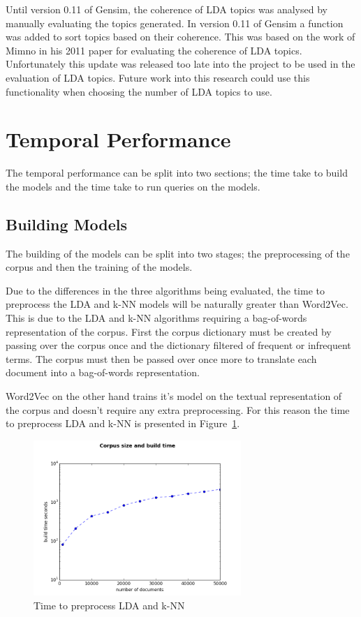 Until version 0.11 of Gensim, the coherence of LDA topics was analysed by manually evaluating the topics generated.
In version 0.11 of Gensim a function was added to sort topics based on their coherence.
This was based on the work of Mimno in his 2011 paper for evaluating the coherence of LDA topics.
Unfortunately this update was released too late into the project to be used in the evaluation of LDA topics.
Future work into this research could use this functionality when choosing the number of LDA topics to use.

\section{Temporal Performance}
The temporal performance can be split into two sections; the time take to build the models and the time take to run queries on the models.

\subsection{Building Models}
The building of the models can be split into two stages;
the preprocessing of the corpus and then the training of the models.

Due to the differences in the three algorithms being evaluated, the time to preprocess the LDA and k-NN models will be naturally greater than Word2Vec.
This is due to the LDA and k-NN algorithms requiring a bag-of-words representation of the corpus.
First the corpus dictionary must be created by passing over the corpus once and the dictionary filtered of frequent or infrequent terms.
The corpus must then be passed over once more to translate each document into a bag-of-words representation.

Word2Vec on the other hand trains it's model on the textual representation of the corpus and doesn't require any extra preprocessing.
For this reason the time to preprocess LDA and k-NN is presented in Figure~\ref{fig:BuildBow}.

\begin{figure}[h]
    \centering
        \includegraphics[width=0.7\textwidth]{Figures/BuildBOW.png}
    \caption{Time to preprocess LDA and k-NN}
    \label{fig:BuildBow}
\end{figure}

